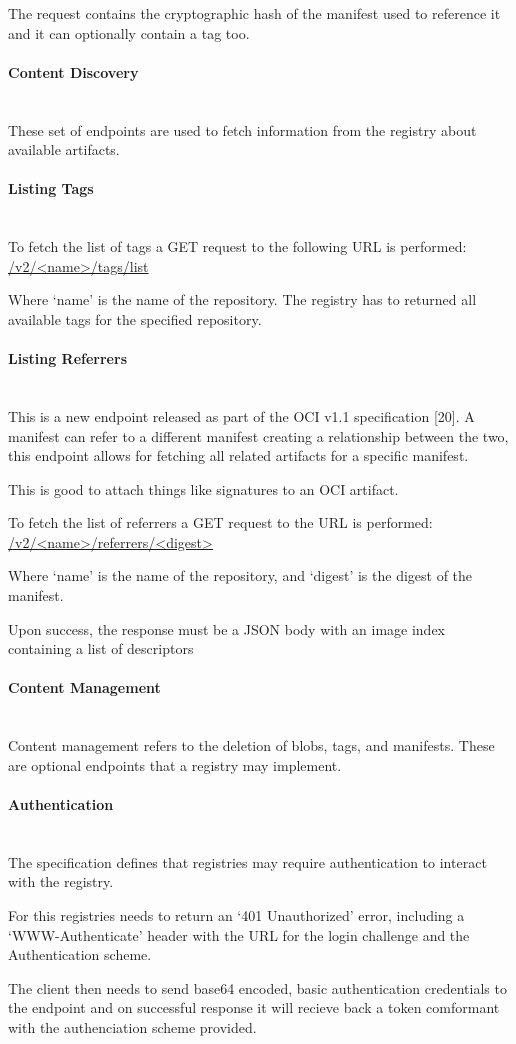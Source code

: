 \documentclass{article}
\newcommand{\subsubsubsection}[1]{\paragraph{#1}\mbox{}\\}
\begin{document}
  The request contains the cryptographic hash of the manifest used to reference it and it can optionally contain a tag too.

  \subsubsubsection{Content Discovery}

  These set of endpoints are used to fetch information from the registry about available artifacts.

  \subsubsubsection{Listing Tags}

  To fetch the list of tags a GET request to the following URL is performed: \url{/v2/<name>/tags/list}

  Where `name' is the name of the repository. The registry has to returned all available tags for the specified repository.

  \subsubsubsection{Listing Referrers}

  This is a new endpoint released as part of the OCI v1.1 specification [20]. A manifest can refer to a different manifest creating a relationship between the two, this endpoint allows for fetching all related artifacts for a specific manifest.
  
  This is good to attach things like signatures to an OCI artifact.

  To fetch the list of referrers a GET request to the URL is performed: \url{/v2/<name>/referrers/<digest>}

  Where `name' is the name of the repository, and `digest' is the digest of the manifest.

  Upon success, the response must be a JSON body with an image index containing a list of descriptors

  \subsubsubsection{Content Management}

  Content management refers to the deletion of blobs, tags, and manifests. These are optional endpoints that a registry may implement.

  \subsubsubsection{Authentication}
  
  The specification defines that registries may require authentication to interact with the registry.

  For this registries needs to return an `401 Unauthorized' error, including a `WWW-Authenticate' header with the URL for the login challenge and the Authentication scheme.
  
  The client then needs to send base64 encoded, basic authentication credentials to the endpoint and on successful response it will recieve back a token comformant with the authenciation scheme provided. 
\end{document}
